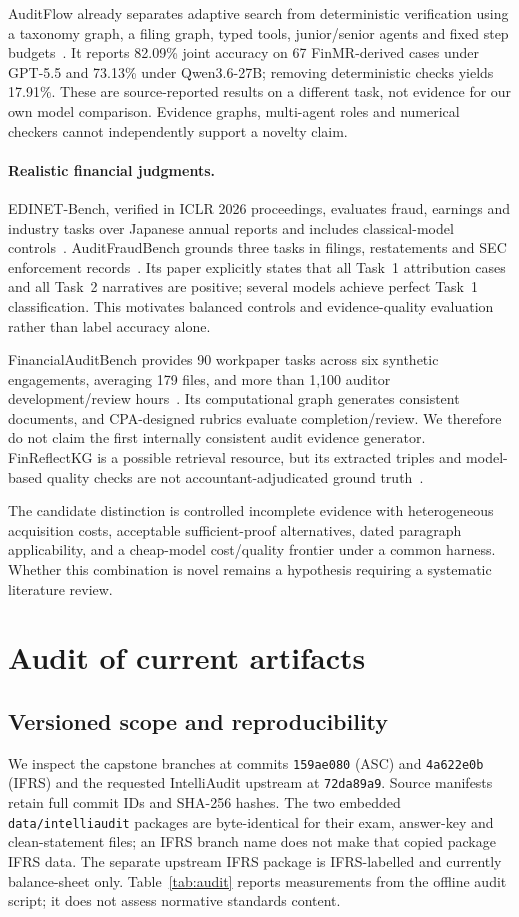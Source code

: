 \documentclass[11pt]{article}
\begin{document}
AuditFlow already separates adaptive search from deterministic verification using a taxonomy graph, a filing graph, typed tools, junior/senior agents and fixed step budgets~\cite{auditflow}. It reports 82.09\% joint accuracy on 67 FinMR-derived cases under GPT-5.5 and 73.13\% under Qwen3.6-27B; removing deterministic checks yields 17.91\%. These are source-reported results on a different task, not evidence for our own model comparison. Evidence graphs, multi-agent roles and numerical checkers cannot independently support a novelty claim.

\paragraph{Realistic financial judgments.}
EDINET-Bench, verified in ICLR 2026 proceedings, evaluates fraud, earnings and industry tasks over Japanese annual reports and includes classical-model controls~\cite{edinet}. AuditFraudBench grounds three tasks in filings, restatements and SEC enforcement records~\cite{auditfraudbench}. Its paper explicitly states that all Task~1 attribution cases and all Task~2 narratives are positive; several models achieve perfect Task~1 classification. This motivates balanced controls and evidence-quality evaluation rather than label accuracy alone.

FinancialAuditBench provides 90 workpaper tasks across six synthetic engagements, averaging 179 files, and more than 1,100 auditor development/review hours~\cite{financialauditbench}. Its computational graph generates consistent documents, and CPA-designed rubrics evaluate completion/review. We therefore do not claim the first internally consistent audit evidence generator. FinReflectKG is a possible retrieval resource, but its extracted triples and model-based quality checks are not accountant-adjudicated ground truth~\cite{finreflectkg}.

The candidate distinction is controlled incomplete evidence with heterogeneous acquisition costs, acceptable sufficient-proof alternatives, dated paragraph applicability, and a cheap-model cost/quality frontier under a common harness. Whether this combination is novel remains a hypothesis requiring a systematic literature review.

\section{Audit of current artifacts}
\subsection{Versioned scope and reproducibility}
We inspect the capstone branches at commits \texttt{159ae080} (ASC) and \texttt{4a622e0b} (IFRS) and the requested IntelliAudit upstream at \texttt{72da89a9}. Source manifests retain full commit IDs and SHA-256 hashes. The two embedded \texttt{data/intelliaudit} packages are byte-identical for their exam, answer-key and clean-statement files; an IFRS branch name does not make that copied package IFRS data. The separate upstream IFRS package is IFRS-labelled and currently balance-sheet only. Table~\ref{tab:audit} reports measurements from the offline audit script; it does not assess normative standards content.
\end{document}
